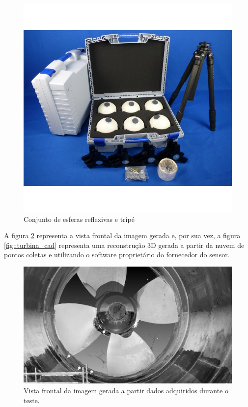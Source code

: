 \begin{figure}[h!]
\centering
	\includegraphics[width=0.9\columnwidth]{figs/3dsensors/kit}
	\caption{Conjunto de esferas reflexivas e tripé}
	\label{fig::esferas}
\end{figure}

A figura \ref{fig::turbina_faro} representa a vista frontal da imagem gerada e, por sua
vez, a figura \ref{fig::turbina_cad} representa uma reconstrução 3D gerada a
partir da nuvem de pontos coletas e utilizando o software proprietário do
fornecedor do sensor. 

\begin{figure}[h!]
\centering
	\includegraphics[width=0.9\columnwidth]{figs/3dsensors/recorte_video}
	\caption{Vista frontal da imagem gerada a partir dados adquiridos durante o
	teste.}
	\label{fig::turbina_faro}
\end{figure}

